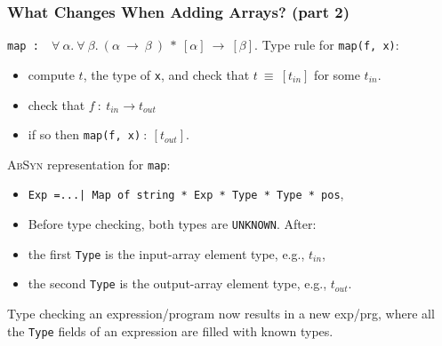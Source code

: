 \documentclass{beamer}
\renewcommand{\emph}[1]{\textcolor{structure}{#1}}
\newcommand{\emp}[1]{\textcolor{DikuRed}{ #1}}
\begin{document}
\begin{frame}[fragile,t]
   \frametitle{What Changes When Adding Arrays? (part 2)}

\bigskip

{\tt map~:~}~$\forall~\alpha.~\forall~\beta.~(\alpha~\rightarrow~\beta~)~*~[\alpha]~\rightarrow~[\beta]$.
        \emp{Type rule for {\tt map(f, x)}:}

\smallskip

\begin{itemize}
    \item compute $t$, the type of {\tt x}, and check that $t~\equiv~[t_{in}]$ for some $t_{in}$.
    \item check that $f~:~t_{in} \rightarrow t_{out}$
    \item if so then {\tt map(f, x)}$~:~[t_{out}]$.
\end{itemize}

\bigskip

\emp{\textsc{AbSyn} representation for {\tt map}:}

\begin{itemize}
    \item {\tt Exp =...| Map of string * Exp * Type * Type * pos},
    \item \alert{Before type checking}, both types are \alert{{\tt UNKNOWN}}. \emph{After:}
    \item the first {\tt Type} is the \emph{input-array element type}, e.g., $t_{in}$,
    \item the second {\tt Type} is the \emph{output-array element type}, e.g., $t_{out}$.
\end{itemize}

\bigskip

\emp{Type checking an expression/program now results in a new exp/prg,
where all the {\tt Type} fields of an expression are filled with known types.}


\end{frame}
\end{document}

